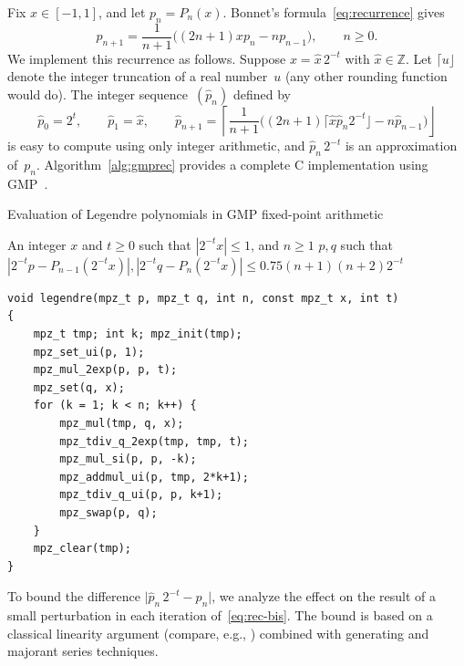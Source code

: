 \documentclass[11pt,a4paper]{article}
\newcommand{\abs}[1]{\mathopen| #1 \mathclose|}
\begin{document}
Fix $x \in [-1, 1]$, and let $p_n = P_n(x)$.
Bonnet's formula~\eqref{eq:recurrence} gives
\begin{equation} \label{eq:rec-bis}
  p_{n + 1} =
    \frac{1}{n+1}
    \bigl( (2n +1) x p_n - n p_{n-1} \bigr),
  \qquad n \geq 0.
\end{equation}
We implement this recurrence as follows.
Suppose $x = \hat x \, 2^{-t}$ with $\hat x \in \mathbb Z$.
Let $\lceil u \rfloor$ denote the integer truncation of a real
number~$u$ (any other rounding function would do).
The integer sequence $(\hat p_n)$ defined by
\begin{equation} \label{eq:rec-fxpt}
  \hat{p}_0 = 2^t, \qquad
  \hat{p}_1 = \hat x, \qquad
  \hat{p}_{n + 1} =
    \left\lceil \frac{1}{n + 1}  \bigl( (2 n + 1) \lceil \hat{x}
      \hat{p}_n 2^{- t} \rfloor - n \hat{p}_{n - 1} \bigr)
    \right\rfloor
\end{equation}
is easy to compute using only integer arithmetic, and
$\hat p_n \, 2^{-t}$ is an approximation of $p_n$.
Algorithm~\ref{alg:gmprec} provides a complete C implementation
using GMP~\cite{granlund2017}.

\begin{algorithm}[h!]
  \caption{Evaluation of Legendre polynomials in GMP fixed-point arithmetic}
  \small
  \label{alg:gmprec}
  \begin{algorithmic}[1]
    \Require An integer $x$ and $t \ge 0$ such that $|2^{-t} x| \le 1$, and $n \ge 1$
    \Ensure $p, q$ such that $|2^{-t} p - P_{n-1}(2^{-t} x)|, |2^{-t} q - P_{n}(2^{-t} x)| \le 0.75 (n+1)(n+2) 2^{-t}$
  \end{algorithmic}
\begin{verbatim}
void legendre(mpz_t p, mpz_t q, int n, const mpz_t x, int t)
{
    mpz_t tmp; int k; mpz_init(tmp);
    mpz_set_ui(p, 1);
    mpz_mul_2exp(p, p, t);
    mpz_set(q, x);
    for (k = 1; k < n; k++) {
        mpz_mul(tmp, q, x);
        mpz_tdiv_q_2exp(tmp, tmp, t);
        mpz_mul_si(p, p, -k);
        mpz_addmul_ui(p, tmp, 2*k+1);
        mpz_tdiv_q_ui(p, p, k+1);
        mpz_swap(p, q);
    }
    mpz_clear(tmp);
}
\end{verbatim}
\end{algorithm}

To bound the difference $\abs{\hat p_n \, 2^{-t} - p_n}$, we analyze
the effect on the result of a small perturbation in each iteration
of \eqref{eq:rec-bis}.
The bound is based on a classical linearity argument (compare, e.g.,
\cite{Wimp1984}) combined with generating and majorant series
techniques.
\end{document}
